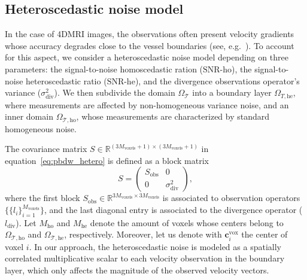 \newcommand{\snrho}{\text{SNR-ho}}
\newcommand{\snrhe}{\text{SNR-he}}

\subsection{Heteroscedastic noise model}
In the case of 4DMRI images, the observations often present velocity gradients whose accuracy degrades close to the vessel boundaries (see, e.g.~\cite{zingaro2024advancing, IRARRAZAVAL2019250}).
To account for this aspect, we consider a heteroscedastic noise model depending on three parameters:
the signal-to-noise homoscedastic ration ($\snrho$), the signal-to-noise heteroscedastic ratio ($\snrhe$), and the divergence observations operator's variance ($\sigma_{\text{div}}^2$).
We then subdivide the domain $\Omega_{\mathcal T}$ into a boundary layer $\Omega_{T, \text{he}}$, where measurements are affected by non-homogeneous variance noise, and 
an inner domain $\Omega_{\mathcal T, \text{ho}}$, whose measurements are characterized by standard homogeneous noise.


The covariance matrix $S\in\mathbb{R}^{(3M_{\text{voxels}}+1)\times (3M_{\text{voxels}}+1)}$ in equation~\eqref{eq:pbdw_hetero} is defined as a block matrix
\begin{equation*}
  S = \begin{pmatrix}
    S_{\text{obs}} & 0\\
    0 & \sigma_{\text{div}}^2
    \end{pmatrix},\end{equation*}
where the first block $S_{\text{obs}}\in\mathbb{R}^{3M_{\text{voxels}}\times 3M_{\text{voxels}}}$ is associated to observation operators $\{\{l_i\}_{i=1}^{M_{\text{voxels}}}\}$, and the last diagonal 
entry is associated to the divergence operator ($l_{\text{div}}$).
Let $M_{\text{ho}}$ and $M_{\text{he}}$ denote the amount of voxels whose centers belong to $\Omega_{\mathcal T, \text{ho}}$ and $\Omega_{\mathcal T, \text{he}}$, respectively.
Moreover, let us denote with $\mathbf{c}^{\text{vox}}_i$ the center of voxel $i$.
In our approach, the heteroscedastic noise is modeled as a spatially correlated multiplicative scalar to each velocity observation in the boundary layer, which
only affects the magnitude of the observed velocity vectors.

